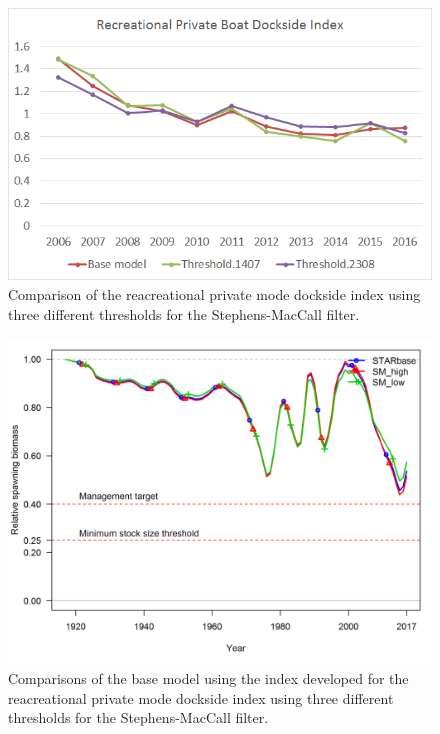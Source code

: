 \documentclass[12pt,]{article}
\begin{document}
\vspace{5cm}

\begin{figure}[htbp]
\centering
\includegraphics{Figures/Request3a.png}
\caption{Comparison of the reacreational private mode dockside index
using three different thresholds for the Stephens-MacCall filter.
\label{fig:Request3a}}
\end{figure}

\begin{figure}[htbp]
\centering
\includegraphics{Figures/Request3b.png}
\caption{Comparisons of the base model using the index developed for the
reacreational private mode dockside index using three different
thresholds for the Stephens-MacCall filter.\label{fig:Request3b}}
\end{figure}
\end{document}

